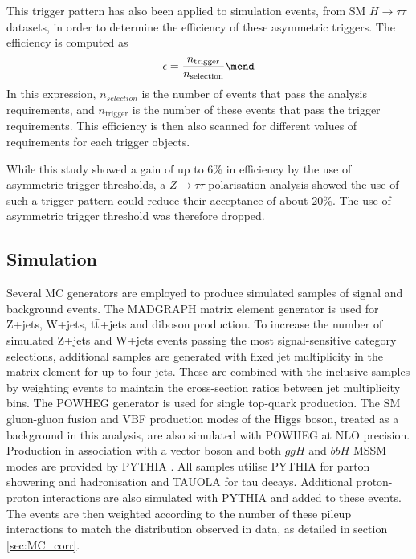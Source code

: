 This trigger pattern has also been applied to simulation events, from SM $H\rightarrow \tau\tau$ datasets, in order to determine the efficiency of these asymmetric triggers. The efficiency is computed as
\begin{equation}
    \epsilon = \frac{n_{\mathrm{trigger}}}{n_{\mathrm{selection}}} \mend
\end{equation}
In this expression, $n_{selection}$ is the number of events that pass the analysis requirements, and $n_{\mathrm{trigger}}$ is the number of these events that pass the trigger \pt requirements. This efficiency is then also scanned for different values of \pt requirements for each \tauh trigger objects.

While this study showed a gain of up to $6\%$ in efficiency by the use of asymmetric trigger thresholds, a $Z\rightarrow \tau\tau$ polarisation analysis showed the use of such a trigger pattern could reduce their acceptance of about $20\%$. The use of asymmetric \tauh trigger \pt threshold was therefore dropped.

\subsection{Simulation}
Several MC generators are employed to produce simulated samples of signal and background events. The MADGRAPH \cite{Alwall2011} matrix element generator is used for Z+jets, W+jets, $\mathrm{t\Bar{t}}$+jets and diboson production. To increase the number of simulated Z+jets and W+jets events passing the most signal-sensitive category selections, additional samples are generated with fixed jet multiplicity in the matrix element for up to four jets. These are combined with the inclusive samples by weighting events to maintain the cross-section ratios between jet multiplicity bins. The POWHEG \cite{Alioli2010} generator is used for single top-quark production. The SM gluon-gluon fusion and VBF production modes of the Higgs boson, treated as a background in this analysis, are also simulated with POWHEG at NLO precision. Production in association with a vector boson and both $ggH$ and $bbH$ MSSM modes are provided by PYTHIA \cite{SJOSTRAND2008852}. All samples utilise PYTHIA for parton showering and hadronisation and TAUOLA \cite{JADACH1991275} for tau decays. Additional proton-proton interactions are also simulated with PYTHIA and added to these events. The events are then weighted according to the number of these pileup interactions to match the distribution observed in data, as detailed in section \ref{sec:MC_corr}. 


